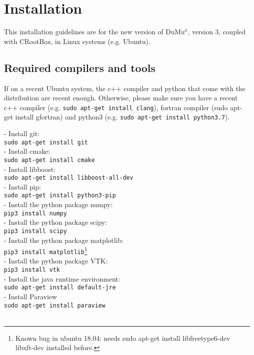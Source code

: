 \chapter*{Installation}
This installation guidelines are for the new version of DuMu$^{x}$, version 3, coupled with CRootBox, in Linux systems (e.g. Ubuntu). 

\section*{Required compilers and tools}
%
If on a recent Ubuntu system, the c++ compiler and python that come with the distribution are recent enough. Otherwise, please make sure you have a recent c++ compiler (e.g. \lstinline{sudo apt-get install clang}), fortran compiler (sudo apt-get install gfortran) and python3 (e.g. \lstinline{sudo apt-get install python3.7}). 

- Install git: \\
\lstinline{sudo apt-get install git}\\
- Install cmake:\\
\lstinline{sudo apt-get install cmake}\\
- Install libboost:\\
\lstinline{sudo apt-get install libboost-all-dev}\\
- Install pip:\\
\lstinline{sudo apt-get install python3-pip}\\
- Install the python package numpy:\\
\lstinline{pip3 install numpy}\\
- Install the python package scipy:\\
\lstinline{pip3 install scipy}\\
- Install the python package matplotlib:\\
\lstinline{pip3 install matplotlib}\footnote{Known bug in ubuntu 18.04: needs sudo apt-get install libfreetype6-dev libxft-dev installed before.}\\
- Install the python package VTK:\\
\lstinline {pip3 install vtk}\\
- Install the java runtime environment:\\
\lstinline{sudo apt-get install default-jre}\\
- Install Paraview\\
\lstinline{sudo apt-get install paraview}\\


\lstinline{}\\

